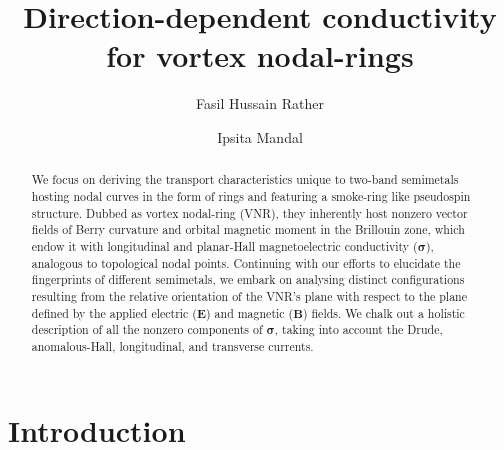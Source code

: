 \documentclass[aps,prb,onecolumn, footinbib, 10pt]{revtex4-2}
\newcommand{\bs}[1]{\boldsymbol{#1}}
\begin{document}
\title{Direction-dependent conductivity for vortex nodal-rings}

\author{Fasil Hussain Rather}
\author{Ipsita Mandal}



\begin{abstract}
We focus on deriving the transport characteristics unique to two-band semimetals hosting nodal curves in the form of rings and featuring a smoke-ring like pseudospin structure. Dubbed as vortex nodal-ring (VNR), they inherently host nonzero vector fields of Berry curvature and orbital magnetic moment in the Brillouin zone, which endow it with longitudinal and planar-Hall magnetoelectric conductivity ($\bs \sigma$), analogous to topological nodal points. Continuing with our efforts to elucidate the fingerprints of different semimetals, we embark on analysing distinct configurations resulting from the relative orientation of the VNR's plane with respect to the plane defined by the applied electric ($\bs E $) and magnetic ($\bs B$) fields. We chalk out a holistic description of all the nonzero components of $\bs \sigma $, taking into account the Drude, anomalous-Hall, longitudinal, and transverse currents.
\end{abstract}

\maketitle

 \tableofcontents



\section{Introduction}
\end{document}
